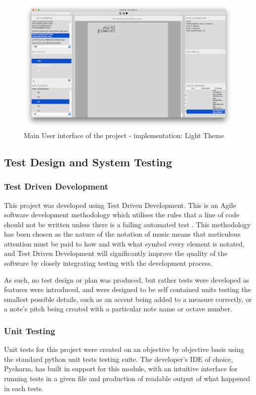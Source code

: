 \begin{figure}[H]
	\centering
    \includegraphics[width=400pt]{designs/main_light.png}
    \caption{Main User interface of the project - implementation: Light Theme}
    \label{fig:main_light}
\end{figure}
\subsection{Test Design and System Testing}
\subsubsection{Test Driven Development}
This project was developed using Test Driven Development. This is an Agile software development methodology which utilises the rules that a line of code should not be written unless there is a failing automated test \parencite{TDD}. This methodology has been chosen as the nature of the notation of music means that meticulous attention must be paid to how and with what symbol every element is notated, and Test Driven Development will significantly improve the quality of the software by closely integrating testing with the development process.

As such, no test design or plan was produced, but rather tests were developed as features were introduced, and were designed to be self contained units testing the smallest possible details, such as an accent being added to a measure correctly, or a note's pitch being created with a particular note name or octave number.

\subsubsection{Unit Testing}
Unit tests for this project were created on an objective by objective basis using the standard python unit tests testing suite. The developer's IDE of choice, Pycharm, has built in support for this module, with an intuitive interface for running tests in a given file and production of readable output of what happened in each tests.

